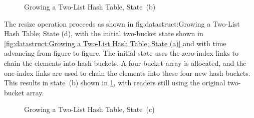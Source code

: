 \begin{figure}
\centering
{}
\caption{Growing a Two-List Hash Table, State~(b)}
\label{fig:datastruct:Growing a Two-List Hash Table; State (b)}
\end{figure}

The resize operation proceeds as shown in
{fig:datastruct:Growing a Two-List Hash Table; State (d)},
with the initial two-bucket state shown in
\cref{fig:datastruct:Growing a Two-List Hash Table; State (a)}
and with time advancing from figure to figure.
The initial state uses the zero-index links to chain the elements into
hash buckets.
A four-bucket array is allocated, and the one-index links are used to
chain the elements into these four new hash buckets.
This results in state~(b) shown in
\cref{fig:datastruct:Growing a Two-List Hash Table; State (b)},
with readers still using the original two-bucket array.

\begin{figure}
\centering
{}
\caption{Growing a Two-List Hash Table, State~(c)}
\label{fig:datastruct:Growing a Two-List Hash Table; State (c)}
\end{figure}

